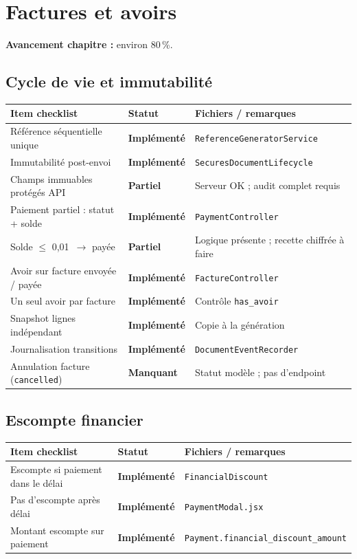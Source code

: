 \documentclass[11pt,a4paper]{report}
\newcommand{\route}[1]{\texttt{\small #1}}
\newcommand{\ctrl}[1]{\texttt{\small #1}}
\newcommand{\svc}[1]{\texttt{\small #1}}
\newcommand{\model}[1]{\texttt{\small #1}}
\newcommand{\statimpl}{\textcolor{statok}{\textbf{Implémenté}}}
\newcommand{\statpart}{\textcolor{statpartial}{\textbf{Partiel}}}
\newcommand{\statmiss}{\textcolor{statno}{\textbf{Manquant}}}
\begin{document}
\chapter{Factures et avoirs}

\textbf{Avancement chapitre :} environ 80\,\%.

\section{Cycle de vie et immutabilité}

\begin{longtable}{@{}L{7.8cm}C{2.4cm}L{4.4cm}@{}}
    \toprule
    \textbf{Item checklist} & \textbf{Statut} & \textbf{Fichiers / remarques} \\
    \midrule
    \endhead
    Référence séquentielle unique & \statimpl & \svc{ReferenceGeneratorService} \\
    Immutabilité post-envoi & \statimpl & \ctrl{SecuresDocumentLifecycle} \\
    Champs immuables protégés API & \statpart & Serveur OK ; audit complet requis \\
    Paiement partiel : statut + solde & \statimpl & \ctrl{PaymentController} \\
    Solde $\leq$ 0{,}01\,\€ $\rightarrow$ payée & \statpart & Logique présente ; recette chiffrée à faire \\
    Avoir sur facture envoyée / payée & \statimpl & \ctrl{FactureController} \\
    Un seul avoir par facture & \statimpl & Contrôle \texttt{has\_avoir} \\
    Snapshot lignes indépendant & \statimpl & Copie à la génération \\
    Journalisation transitions & \statimpl & \svc{DocumentEventRecorder} \\
    Annulation facture (\texttt{cancelled}) & \statmiss & Statut modèle ; pas d'endpoint \\
    \bottomrule
\end{longtable}

\section{Escompte financier}

\begin{longtable}{@{}L{7.8cm}C{2.4cm}L{4.4cm}@{}}
    \toprule
    \textbf{Item checklist} & \textbf{Statut} & \textbf{Fichiers / remarques} \\
    \midrule
    \endhead
    Escompte si paiement dans le délai & \statimpl & \svc{FinancialDiscount} \\
    Pas d'escompte après délai & \statimpl & \route{PaymentModal.jsx} \\
    Montant escompte sur paiement & \statimpl & \model{Payment.financial\_discount\_amount} \\
    \bottomrule
\end{longtable}
\end{document}
